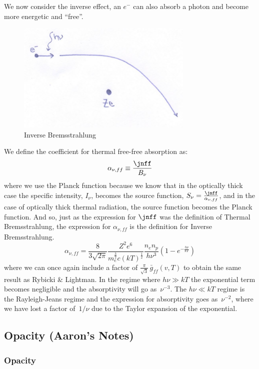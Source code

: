 \documentclass{article}
\def\hf{\frac12}
\def\hf{\frac12}
\begin{document}
We now consider the inverse effect, an $e^-$ can also absorb a photon and become more energetic and ``free''.  
\begin{figure}
    \centering
    \includegraphics[width=0.75\textwidth]{800px-InvBremsstrahlung.jpg}
    \caption{Inverse Bremsstrahlung}
    \label{fig:inBremsstrahlung}
\end{figure}
We define the coefficient for thermal free-free absorption as:
\def\anff{\alpha_{\nu,ff}}
$$\anff\equiv\frac{\jnff}{ B_{\nu}}$$
where we use the Planck function because we know that in the optically thick case the specific intensity, $I_{\nu}$, becomes the source function, $S_{\nu}=\frac{\jnff}{ \anff}$, and in the case of optically thick thermal radiation, the source function becomes the Planck function. And so, just as the expression for $\jnff$ was the definition of Thermal Bremsstrahlung, the expression for $\anff$ is the definition for Inverse Bremsstrahlung. 
$$\boxed{\anff=\frac{8}{3\sqrt{2\pi}}\frac{Z^2e^6}{ m_e^\frac{3}{2}c(kT)^\hf}\frac{n_en_p}{ h\nu^3}\left({1-e^{-\frac{h\nu}{ kT}}}\right)}$$
where we can once again include a factor of $\frac{\pi}{\sqrt{3}}\,\bar{g}_{ff}(v,T)$ to obtain the same result as Rybicki \&
Lightman. In the regime where $h\nu\gg kT$ the exponential term becomes negligible and the absorptivity will go as $\,\nu^{-3}$. The $h\nu\ll kT$ regime is the Rayleigh-Jeans regime and the expression for absorptivity goes as $\,\nu^{-2}$, where we have lost a factor of ${\,1/\nu}$ due to the Taylor expansion of the exponential.

\subsection{Opacity (Aaron's Notes)}

\subsubsection{Opacity}
\end{document}
